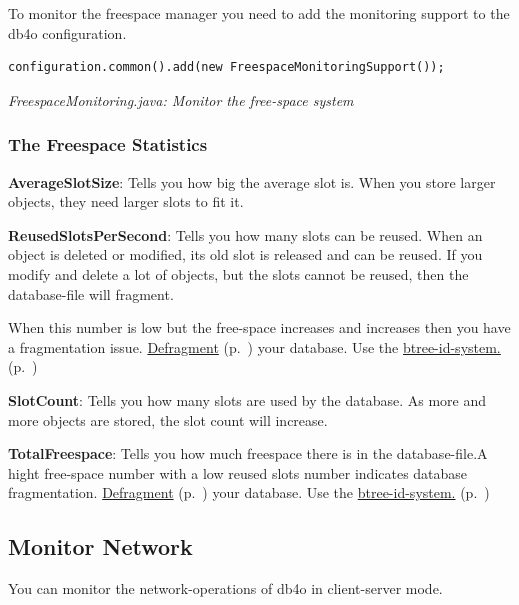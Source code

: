 To monitor the freespace manager you need to add the monitoring support to the db4o configuration.

\begin{lstlisting}
configuration.common().add(new FreespaceMonitoringSupport());
\end{lstlisting}

{\small\itshape FreespaceMonitoring.java: Monitor the free-space system\par}
\medskip

\subsubsection*{The Freespace Statistics}

\textbf{AverageSlotSize}: Tells you how big the average slot is. When you store larger objects, they need larger slots to fit it.

\textbf{ReusedSlotsPerSecond}: Tells you how many slots can be reused. When an object is deleted or modified, its old slot is released and can be reused. If you modify and delete a lot of objects, but the slots cannot be reused, then the database-file will fragment.

When this number is low but the free-space increases and increases then you have a fragmentation issue. \hyperref[ref:advanced-topics-defragment]{Defragment} (p.~\pageref{ref:advanced-topics-defragment}) your database. Use the \hyperref[ref:configuration-id-system]{btree-id-system.} (p.~\pageref{ref:configuration-id-system})

\textbf{SlotCount}: Tells you how many slots are used by the database. As more and more objects are stored, the slot count will increase.

\textbf{TotalFreespace}: Tells you how much freespace there is in the database-file.A hight free-space number with a low reused slots number indicates database fragmentation. \hyperref[ref:advanced-topics-defragment]{Defragment} (p.~\pageref{ref:advanced-topics-defragment}) your database. Use the \hyperref[ref:configuration-id-system]{btree-id-system.} (p.~\pageref{ref:configuration-id-system})

\subsection{Monitor Network}
\label{ref:advanced-topics-runtime-statistics-monitor-network}

You can monitor the network-operations of db4o in client-server mode.

